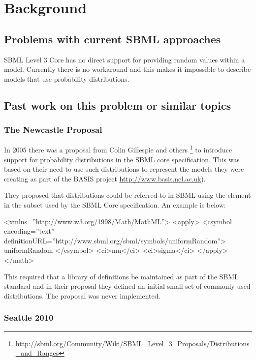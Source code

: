 \documentclass[draftspec]{sbmlpkgspec}
\begin{document}
\section{Background}

\subsection{Problems with current SBML approaches}

SBML Level 3 Core has no direct support for providing random values
within a model. Currently there is no workaround and this makes it
impossible to describe models that use probability distributions.

\subsection{Past work on this problem or similar topics}

\subsubsection{The Newcastle Proposal}
\label{sec:newcastle proposal}

In 2005 there was a proposal from Colin Gillespie and others
\footnote{\url{http://sbml.org/Community/Wiki/SBML_Level_3_Proposals/Distributions_and_Ranges}}
to introduce support for probability distributions in the SBML core specification. This
was based on their need to use such distributions to represent the
models they were creating as part of the BASIS project
\url{http://www.basis.ncl.ac.uk}).

They proposed that distributions could be referred to in SBML using
the  element in the \mathml subset used by
the SBML Core specification. An example is below:

\begin{example}
<xmlns=''http://www.w3.org/1998/Math/MathML''>
  <apply>
    <csymbol encoding=''text''
        definitionURL=''http://www.sbml.org/sbml/symbols/uniformRandom''>
      uniformRandom
    </csymbol>
    <ci>mu</ci>
    <ci>sigma</ci>
  </apply>
</math>
\end{example}

This required that a library of definitions be maintained as part of
the SBML standard and in their proposal they defined an initial small
set of commonly used distributions. The proposal was never
implemented.

\subsubsection{Seattle 2010}
\end{document}
